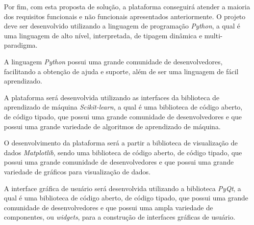         Por fim, com esta proposta de solução, a plataforma conseguirá atender a maioria dos requisitos funcionais e não funcionais apresentados anteriormente. O projeto deve ser desenvolvido utilizando a linguagem de programação \textit{Python}, a qual é uma linguagem de alto nível, interpretada, de tipagem dinâmica e multi-paradigma.

        A linguagem \textit{Python} possui uma grande comunidade de desenvolvedores, facilitando a obtenção de ajuda e suporte, além de ser uma linguagem de fácil aprendizado.

        A plataforma será desenvolvida utilizando as interfaces da biblioteca de aprendizado de máquina \textit{Scikit-learn}, a qual é uma biblioteca de código aberto, de código tipado, que possui uma grande comunidade de desenvolvedores e que possui uma grande variedade de algoritmos de aprendizado de máquina.


        O desenvolvimento da plataforma será a partir a biblioteca de visualização de dados \textit{Matplotlib}, sendo uma biblioteca de código aberto, de código tipado, que possui uma grande comunidade de desenvolvedores e que possui uma grande variedade de gráficos para visualização de dados.

        A interface gráfica de usuário será desenvolvida utilizando a biblioteca \textit{PyQt}, a qual é uma biblioteca de código aberto, de código tipado, que possui uma grande comunidade de desenvolvedores e que possui uma ampla variedade de componentes, ou \textit{widgets}, para a construção de interfaces gráficas de usuário.

    \setlength{\leftskip}{0pt}

